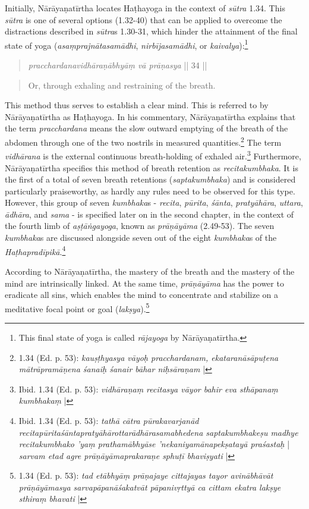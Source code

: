 Initially, Nārāyaṇatīrtha locates Haṭhayoga in the context of \textit{sūtra} 1.34. This \textit{sūtra} is one of several options (1.32-40) that can be applied to overcome the distractions described in \textit{sūtra}s 1.30-31, which hinder the attainment of the final state of yoga (\textit{asaṃprajnātasamādhi}, \textit{nirbījasamādhi}, or \textit{kaivalya}):\footnote{This final state of yoga is called \textit{rājayoga} by Nārāyaṇatīrtha.} 
\begin{quote} \textit{pracchardanavidhāraṇābhyāṃ vā prāṇasya} || 34 || \end{quote}
\begin{quote} Or, through exhaling and restraining of the breath. \end{quote}

This method thus serves to establish a clear mind. This is referred to by Nārāyaṇatīrtha as Haṭhayoga. In his commentary, Nārāyaṇatīrtha explains that the term \textit{pracchardana} means the slow outward emptying of the breath of the abdomen through one of the two nostrils in measured quantities.\footnote{ 1.34 (Ed. p. 53): \textit{kauṣṭhyasya vāyoḥ pracchardanam, ekataranāsāpuṭena mātrāpramāṇena śanaiḥ śanair bāhar niḥsāraṇam} |} The term \textit{vidhārana} is the external continuous breath-holding of exhaled air.\footnote{Ibid. 1.34 (Ed. p. 53): \textit{vidhāraṇaṃ recitasya vāyor bahir eva sthāpanaṃ kumbhakaṃ} |} Furthermore, Nārāyaṇatīrtha specifies this method of breath retention as \textit{recitakumbhaka}. It is the first of a total of seven breath retentions (\textit{saptakumbhaka}) and is considered particularly praiseworthy, as hardly any rules need to be observed for this type. However, this group of seven \textit{kumbhaka}s - \textit{recita}, \textit{pūrita}, \textit{śānta}, \textit{pratyāhāra}, \textit{uttara}, \textit{ādhāra}, and \textit{sama} - is specified later on in the second chapter, in the context of the fourth limb of \textit{aṣṭāṅgayoga}, known as \textit{prāṇāyāma} (2.49-53). The seven \textit{kumbhaka}s are discussed alongside seven out of the eight \textit{kumbhaka}s of the \textit{Haṭhapradīpikā}.\footnote{Ibid. 1.34 (Ed. p. 53): \textit{tathā cātra pūrakavarjanād recitapūritaśāntapratyāhārottarādhārasamabhedena saptakumbhakeṣu madhye recitakumbhako 'yaṃ prathamābhyāse 'nekaniyamānapekṣatayā praśastaḥ} | \textit{sarvam etad agre prāṇāyāmaprakaraṇe sphuṭī bhaviṣyati} |}

According to Nārāyaṇatīrtha, the mastery of the breath and the mastery of the mind are intrinsically linked. At the same time, \textit{prāṇāyāma} has the power to eradicate all sins, which enables the mind to concentrate and stabilize on a meditative focal point or goal (\textit{lakṣya}).\footnote{ 1.34 (Ed. p. 53): \textit{tad etābhyāṃ prāṇajaye cittajayas tayor avinābhāvāt prāṇāyāmasya sarvapāpanāśakatvāt pāpanivṛttyā ca cittam ekatra lakṣye sthiraṃ bhavati} |}


